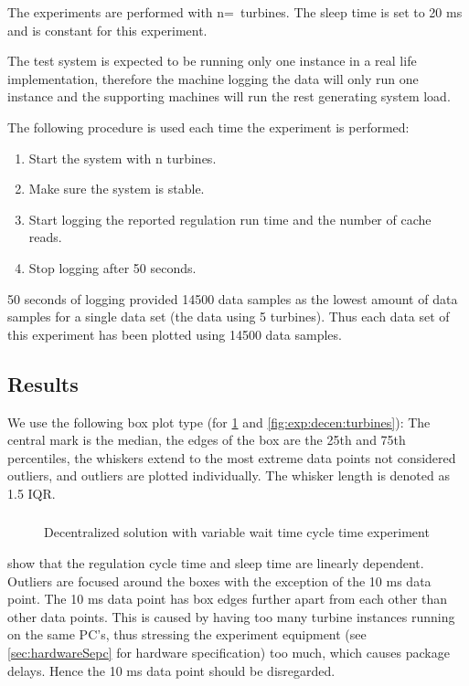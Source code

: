 The experiments are performed with n=\testTurbineNumbers ~turbines. The sleep time is set to 20 ms and is constant for this experiment.

The test system is expected to be running only one instance in a real life implementation, therefore the machine logging the data will only run one instance and the supporting machines will run the rest generating system load.

The following procedure is used each time the experiment is performed:
\begin{enumerate}
	\item Start the system with n turbines.
	\item Make sure the system is stable.
	\item Start logging the reported regulation run time and the number of cache reads.
	\item Stop logging after 50 seconds.
\end{enumerate}

50 seconds of logging provided 14500 data samples as the lowest amount of data samples for a single data set (the data using 5 turbines). Thus each data set of this experiment has been plotted using 14500 data samples.

\subsection{Results} \label{sec:exp:performance}

We use the following box plot type (for \cref{fig:exp:decen:sleep} and \cref{fig:exp:decen:turbines}): The central mark is the median, the edges of the box are the 25th and 75th percentiles, the whiskers extend to the most extreme data points not considered outliers, and outliers are plotted individually. The whisker length is denoted as 1.5 IQR. 

\subsubsection{}

\begin{figure}[h!]
	\centering
%	
	
	\caption{Decentralized solution with variable wait time cycle time experiment}
	\label{fig:exp:decen:sleep}
\end{figure}

 show that the regulation cycle time and sleep time are linearly dependent. Outliers are focused around the boxes with the exception of the 10 ms data point. The 10 ms data point has box edges further apart from each other than other data points. This is caused by having too many turbine instances running on the same PC's, thus stressing the experiment equipment (see \cref{sec:hardwareSepc} for hardware specification) too much, which causes package delays. Hence the 10 ms data point should be disregarded.

